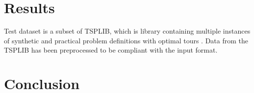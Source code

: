 \section*{Results}

Test dataset is a subset of TSPLIB, which is library containing multiple instances of synthetic and practical problem definitions with optimal tours \cite{reinhelt2014tsplib}. Data from the TSPLIB has been preprocessed to be compliant with the input format.



\section*{Conclusion}
